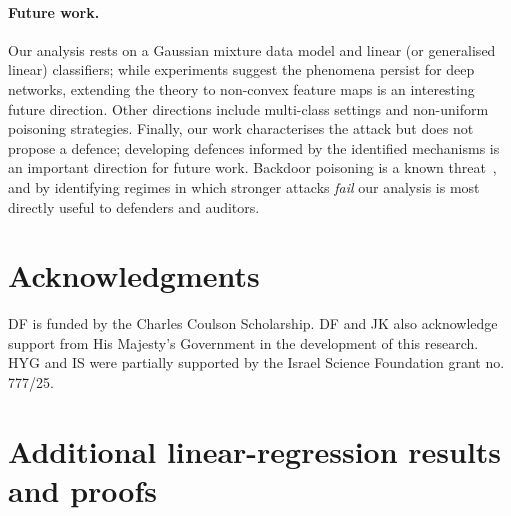\documentclass[11pt]{article}
\begin{document}
\paragraph{Future work.}
Our analysis rests on a Gaussian mixture data model and linear
(or generalised linear) classifiers; while experiments suggest the
phenomena persist for deep networks, extending the theory to non-convex feature maps is an interesting future direction.
Other directions include multi-class settings and non-uniform poisoning strategies.
Finally, our work characterises the attack but does not propose a
defence; developing defences informed by the identified mechanisms is
an important direction for future work. Backdoor poisoning is a known threat~\citep{gu_badnets_2019,li_backdoor_2024}, and by identifying regimes in which stronger attacks \emph{fail} our analysis is most directly useful to defenders and auditors.

\section*{Acknowledgments}
DF is funded by the Charles Coulson Scholarship. DF and JK also acknowledge support from His Majesty's Government in the development of this research. HYG and IS were partially supported by the Israel Science Foundation grant no. 777/25.




\appendix
\newpage
{}
\tableofcontents
\newpage
\section{Additional linear-regression results and proofs}
\label{app:linear_regression}
\end{document}
